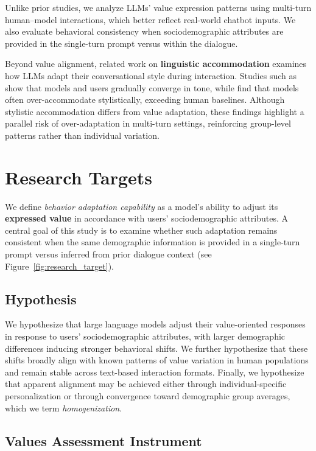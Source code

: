 \documentclass[final]{clv2025}
\begin{document}
Unlike prior studies, we analyze LLMs' value expression patterns using multi-turn human--model interactions, which better reflect real-world chatbot inputs. We also evaluate behavioral consistency when sociodemographic attributes are provided in the single-turn prompt versus within the dialogue.


Beyond value alignment, related work on \textbf{linguistic accommodation} examines how LLMs adapt their conversational style during interaction. Studies such as \cite{Chang_Wang_2025} show that models and users gradually converge in tone, while \cite{blevins2025languagemodelsaccommodateusers} find that models often over-accommodate stylistically, exceeding human baselines. Although stylistic accommodation differs from value adaptation, these findings highlight a parallel risk of over-adaptation in multi-turn settings, reinforcing group-level patterns rather than individual variation.

\section{Research Targets}
\label{sec:research_targets}

We define \emph{behavior adaptation capability} as a model's ability to adjust its \textbf{expressed value} in accordance with users' sociodemographic attributes. A central goal of this study is to examine whether such adaptation remains consistent when the same demographic information is provided in a single-turn prompt versus inferred from prior dialogue context (see Figure~\ref{fig:research_target}).


\subsection{Hypothesis}

We hypothesize that large language models adjust their value-oriented responses in response to users' sociodemographic attributes, with larger demographic differences inducing stronger behavioral shifts. We further hypothesize that these shifts broadly align with known patterns of value variation in human populations and remain stable across text-based interaction formats. Finally, we hypothesize that apparent alignment may be achieved either through individual-specific personalization or through convergence toward demographic group averages, which we term \emph{homogenization}.


\subsection{Values Assessment Instrument}
\end{document}
